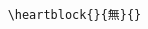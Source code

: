 \documentclass[letterpaper]{article}
\begin{document}
\vspace*{0.5cm}
\begin{multicols}{4}
	\RLmulticolcolumns
	
	\columnbreak
	
	
	\columnbreak
	
	
	\columnbreak
	
	
\end{multicols}

\begin{verbatim}

    \heartblock{}{無}{}
    
\end{verbatim}

\vfill\eject\pagebreak


\vspace*{1cm}

\renewcommand{\kanji}{\centering\fontsize{55}{55}}
\vspace*{2cm}

\begin{multicols}{4}
	\RLmulticolcolumns
	
	\columnbreak
		
	\columnbreak

	\columnbreak
	

\end{multicols}
\end{document}
